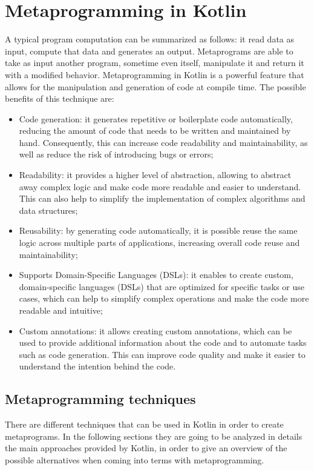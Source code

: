 \chapter{Metaprogramming in Kotlin}\label{chapter:metaprogramming}
A typical program computation can be summarized as follows: it read data as input, compute that data and generates an output. Metaprograms \cite{metaprogramming_introduction} are able to take as input another program, sometime even itself, manipulate it and return it with a modified behavior.\newline
Metaprogramming in Kotlin is a powerful feature that allows for the manipulation and generation of code at compile time. The possible benefits of this technique are:
\begin{itemize}
    \item Code generation: it generates repetitive or boilerplate code automatically, reducing the amount of code that needs to be written and maintained by hand. Consequently, this can increase code readability and maintainability, as well as reduce the risk of introducing bugs or errors;
    \item Readability: it provides a higher level of abstraction, allowing to abstract away complex logic and make code more readable and easier to understand. This can also help to simplify the implementation of complex algorithms and data structures;
    \item Reusability: by generating code automatically, it is possible reuse the same logic across multiple parts of applications, increasing overall code reuse and maintainability;
    \item Supports Domain-Specific Languages (DSLs): it enables to create custom, domain-specific languages (DSLs) that are optimized for specific tasks or use cases, which can help to simplify complex operations and make the code more readable and intuitive;
    \item Custom annotations: it allows creating custom annotations, which can be used to provide additional information about the code and to automate tasks such as code generation. This can improve code quality and make it easier to understand the intention behind the code.
\end{itemize}

\section{Metaprogramming techniques}
There are different techniques that can be used in Kotlin in order to create metaprograms. In the following sections they are going to be analyzed in details the main approaches provided by Kotlin, in order to give an overview of the possible alternatives when coming into terms with metaprogramming.

